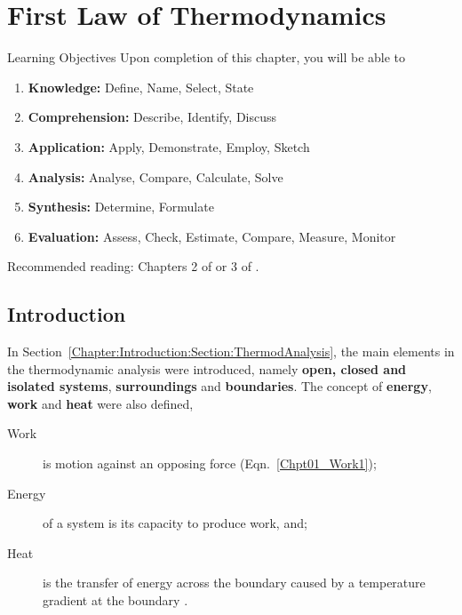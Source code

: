 
\chapter{First Law of Thermodynamics}\label{Chapter:FirstLaw}

   \begin{LearningObjectivesBlock}{Learning Objectives}
      Upon completion of this chapter, you will be able to
        \begin{enumerate}
           \item {\bf Knowledge:} Define, Name, Select, State 
           \item {\bf Comprehension:} Describe, Identify, Discuss
           \item {\bf Application:} Apply, Demonstrate, Employ, Sketch
           \item {\bf Analysis:} Analyse, Compare, Calculate, Solve
           \item {\bf Synthesis:} Determine, Formulate
           \item {\bf Evaluation:} Assess, Check, Estimate, Compare, Measure, Monitor
        \end{enumerate}
\medskip
     Recommended reading: Chapters 2 of \citet{Atkins_Book,SmithVanNess_Book,Moran_Book} or 3 of \citet{Borgnakke_Book}.
   \end{LearningObjectivesBlock}

   
     \section{Introduction}\label{Chapter:FirstLaw:Section:Intro}
     In Section~\ref{Chapter:Introduction:Section:ThermodAnalysis}, the main elements in the thermodynamic analysis were introduced, namely {\bf open, closed and isolated systems}, {\bf surroundings} and {\bf boundaries}. The concept of {\bf energy}, {\bf work} and {\bf heat} were also defined,
     \begin{description}
        \item[Work] is motion against an opposing force (Eqn.~\ref{Chpt01_Work1});
        \item[Energy] of a system is its capacity to produce work, and; 
        \item[Heat] is the transfer of energy across the boundary caused by a temperature gradient at the boundary \citep{Devoe_Book}.
     \end{description}
